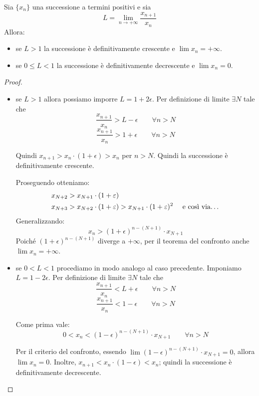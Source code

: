 \begin{theorem}
Sia $\{x_n\}$ una successione a termini positivi e sia 
\begin{equation*}
L = \lim_{n \to +\infty} \frac{x_{n+1}}{x_n}
\end{equation*}
Allora:
\begin{itemize}
\item se $L > 1$ la successione è definitivamente crescente e $\lim x_n = +\infty$.
\item se $0 \le L < 1$ la successione è definitivamente decrescente e $\lim x_n = 0$.
\end{itemize}
\end{theorem}

\begin{proof} \hfill
\begin{itemize}
\item se $L > 1$ allora possiamo imporre $L = 1 + 2\epsilon$. Per definizione di limite $\exists N$ tale che 
\begin{equation*}
\frac{x_{n+1}}{x_n} > L - \epsilon \qquad \forall n > N
\end{equation*}
\begin{equation*}
\frac{x_{n+1}}{x_n} > 1 + \epsilon \qquad \forall n > N
\end{equation*}

Quindi $x_{n+1} > x_n \cdot (1+\epsilon) > x_n$ per $n > N$. Quindi la successione è definitivamente crescente.

Proseguendo otteniamo:
\begin{align*}
x_{N+2} &> x_{N+1} \cdot (1+\epsilon) \\
x_{N+3} &> x_{N+2} \cdot (1+\epsilon) > x_{N+1} \cdot (1+\epsilon)^2 \quad \text { e così via\dots}
\end{align*}
Generalizzando:
\begin{equation*}
x_n > (1+\epsilon)^{n-(N+1)} \cdot x_{N+1}
\end{equation*}
Poiché $(1+\epsilon)^{n-(N+1)}$ diverge a $+\infty$, per il teorema del confronto anche $\lim x_n = +\infty$.

\item se $0 < L < 1$ procediamo in modo analogo al caso precedente. Imponiamo $L = 1 - 2\epsilon$. Per definizione di limite $\exists N$ tale che
\begin{equation*}
\frac{x_{n+1}}{x_n} < L + \epsilon \qquad \forall n > N
\end{equation*}
\begin{equation*}
\frac{x_{n+1}}{x_n} < 1 - \epsilon \qquad \forall n > N
\end{equation*}

Come prima vale:
\begin{equation*}
0 < x_n < (1-\epsilon)^{n-(N+1)} \cdot x_{N+1} \qquad \forall n>N
\end{equation*}

Per il criterio del confronto, essendo $\lim (1-\epsilon)^{n-(N+1)} \cdot x_{N+1} = 0$, allora $\lim x_n = 0$. Inoltre, $x_{n+1} < x_n \cdot (1 - \epsilon) < x_n$; quindi la successione è definitivamente decrescente.
\end{itemize}
\end{proof}
